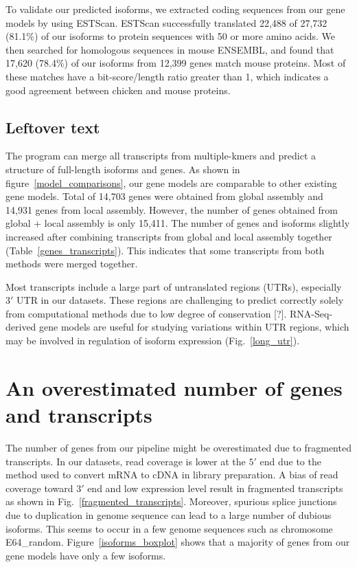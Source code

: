 \documentclass[10pt]{article}
\begin{document}
To validate our predicted isoforms, we extracted coding sequences from
our gene models by using ESTScan\cite{Iseli:1999vd}.  ESTScan
successfully translated 22,488 of 27,732 (81.1\%) of our isoforms to
protein sequences with 50 or more amino acids.  We then searched for
homologous sequences in mouse ENSEMBL, and found that 17,620 (78.4\%)
of our isoforms from 12,399 genes match mouse proteins.
Most of these matches have a bit-score/length ratio greater than 1,
which indicates a good agreement between chicken and mouse proteins.

\subsection{Leftover text}

The program can merge all transcripts from multiple-kmers and predict a structure of full-length isoforms and genes.
As shown in figure~\ref{model_comparisons}, our gene models are comparable to other existing gene models.
Total of 14,703 genes were obtained from global assembly and 14,931 genes from local assembly.
However, the number of genes obtained from global + local assembly is only 15,411.
The number of genes and isoforms slightly increased after combining transcripts from global and local
assembly together (Table~\ref{genes_transcripts}). 
This indicates that some transcripts from both methods were merged together.

Most transcripts include a large part of untranslated regions (UTRs), especially $3'$ UTR in our datasets.
These regions are challenging to predict correctly solely from computational methods due to low degree of conservation [?].
RNA-Seq-derived gene models are useful for studying variations within UTR regions, which may be involved in regulation of isoform expression\cite{} (Fig.~\ref{long_utr}).

\section*{An overestimated number of genes and transcripts}

The number of genes from our pipeline might be overestimated due to
fragmented transcripts.  In our datasets, read coverage is lower at
the $5'$ end due to the method used to convert mRNA to cDNA in library
preparation.  A bias of read coverage toward $3'$ end and low
expression level result in fragmented transcripts as shown in
Fig.~\ref{fragmented_transcripts}.  Moreover, spurious splice
junctions due to duplication in genome sequence can lead to a large
number of dubious isoforms.  This seems to occur in a few genome
sequences such as chromosome E64\_random.
Figure~\ref{isoforms_boxplot} shows that a majority of genes from our
gene models have only a few isoforms.
\end{document}
